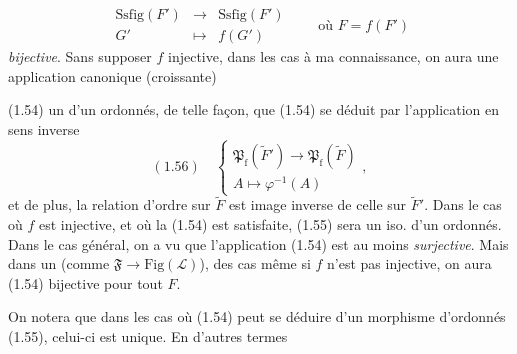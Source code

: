 \documentclass[11pt,a4paper]{article}
\begin{document}
\[
  \begin{array}{ccc}
    \mathrm{Ssfig}(F') & \longrightarrow & \mathrm{Ssfig}(F') \\
    G' & \longmapsto & f(G')
  \end{array}
  \qquad \text{où } F = f(F')
\]
\emph{bijective}. Sans supposer $f$ injective, dans les cas à ma connaissance, on aura une application canonique (croissante)


\ill{} \ill{} (1.54) un \ill{} d'un ordonnés, de telle façon, que (1.54) se déduit par l'application en sens inverse
\[
  (1.56) \quad \left\lbrace
  \begin{array}{c}
    \mathfrak{P}_{\mathrm{f}}(\widetilde{F}') \longrightarrow \mathfrak{P}_{\mathrm{f}}(\widetilde{F}) \\
    A \longmapsto \varphi^{-1}(A)
  \end{array}
  \right. ,
\]
et de plus, la  relation d'ordre sur $\widetilde{F}$ est image inverse de celle sur $\widetilde{F}'$. Dans le cas où $f$ est injective, et où la (1.54) est satisfaite, (1.55) sera un iso. d'un ordonnés. Dans le cas général, on a vu que l'application (1.54) est \struck{\ill{}} au moins \emph{surjective}. \struck{\&} Mais dans  un \ill{} (comme $\mathfrak{F} \to \mathrm{Fig}(\mathcal{L})$), des cas  même si $f$ n'est pas injective, on aura (1.54) bijective pour tout $F$.

On notera que dans les cas où (1.54) peut se déduire d'un \struck{\ill{}} morphisme d'ordonnés (1.55), celui-ci est unique. En d'autres termes

\end{document}

